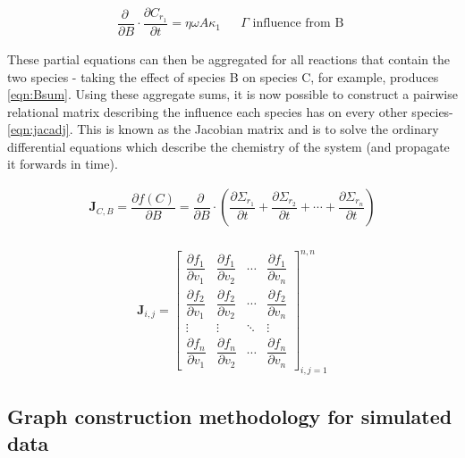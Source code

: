 \begin{eqnarray} 
   \dfrac{\partial \ }{\partial B}\cdot \dfrac{\partial C_{r_1}}{\partial t} = \eta \omega A \kappa_1 & &  \Gamma \text{ influence from B }\label{eqn:B}%
\end{eqnarray}
      
These partial equations can then be aggregated for all reactions that contain the two species - taking the effect of species B on species C, for example, produces \autoref{eqn:Bsum}. Using these aggregate sums, it is now possible to construct a pairwise relational matrix describing the influence each species has on every other species- \autoref{eqn:jacadj}. This is known as the Jacobian matrix and is to solve the ordinary differential equations which describe the chemistry of the system (and propagate it forwards in time). 
 
               
\begin{eqnarray}
   \mathbf{J}_{C,B} = \dfrac{\partial f(C) }{\partial B} =
\dfrac{\partial \ }{\partial B} \cdot \left( \dfrac{\partial \Sigma_{r_1}}{\partial t} + \dfrac{\partial \Sigma_{r_2}}{\partial t} + \cdots +\dfrac{\partial \Sigma_{r_n}}{\partial t} \right)
\label{eqn:Bsum}
\end{eqnarray}\\

\begin{eqnarray}
 \mathbf{J}_{i,j} =
 \begin{bmatrix}
   \dfrac{\partial f_1}{\partial v_1} &
     \dfrac{\partial f_1}{\partial v_2} &
     \cdots &
     \dfrac{\partial f_1}{\partial v_n} \\[13pt]
   \dfrac{\partial f_2}{\partial v_1} &
     \dfrac{\partial f_2}{\partial v_2} &
       \cdots &
     \dfrac{\partial f_2}{\partial v_n} \\[13pt]
       \vdots &
     \vdots & \ddots
        &
     \vdots\\[13pt]
   \dfrac{\partial f_n}{\partial v_1} &
     \dfrac{\partial f_n}{\partial v_2} &
       \cdots &
     \dfrac{\partial f_n}{\partial v_n}
 \end{bmatrix}_{i,j=1}^{n,n}
 \label{eqn:jacadj}
\end{eqnarray}



\subsection{Graph construction methodology for simulated data}\label{sec:graphconstruction}


